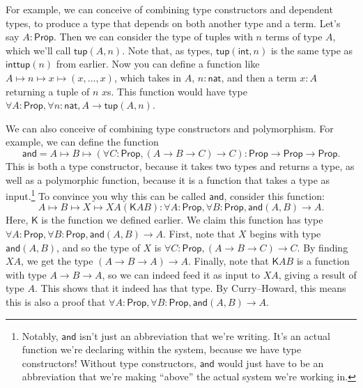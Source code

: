 \documentclass[11pt,paper=letter]{scrartcl}
\renewcommand{\sf}{\mathsf}
\newcommand{\prop}{\mathsf{Prop}}
\begin{document}
For example, we can conceive of combining type constructors and dependent types, to produce a type that depends on both another type and a term. Let's say $A: \prop$. Then we can consider the type of tuples with $n$ terms of type $A$, which we'll call $\sf{tup}(A, n)$. Note that, as types, $\sf{tup}(\sf{int}, n)$ is the same type as $\sf{inttup}(n)$ from earlier. Now you can define a function like $A \mapsto n \mapsto x \mapsto (x, \ldots, x)$, which takes in $A$, $n : \sf{nat}$, and then a term $x : A$ returning a tuple of $n$ $x$s. This function would have type $\forall A: \prop, \forall n: \sf{nat}, A \to \sf{tup}(A, n)$.

We can also conceive of combining type constructors and polymorphism. For example, we can define the function \[
  \sf{and} = A \mapsto B \mapsto (\forall C: \prop, (A \to B \to C) \to C)
  : \prop \to \prop \to \prop.
\]
This is both a type constructor, because it takes two types and returns a type, as well as a polymorphic function, because it is a function that takes a type as input.\footnote{Notably, $\sf{and}$ isn't just an abbreviation that we're writing. It's an actual function we're declaring within the system, because we have type constructors! Without type constructors, $\sf{and}$ would just have to be an abbreviation that we're making ``above'' the actual system we're working in.} To convince you why this can be called $\sf{and}$, consider this function: \[
  A \mapsto B \mapsto X \mapsto XA(\sf{K}AB)
  : \forall A: \prop,
  \forall B: \prop,
  \sf{and}(A, B) \to A.
\]
Here, $\sf{K}$ is the function we defined earlier. We claim this function has type $\forall A: \prop, \forall B: \prop, \sf{and}(A, B) \to A$. First, note that $X$ begins with type $\sf{and}(A, B)$, and so the type of $X$ is $\forall C: \prop, (A \to B \to C) \to C$. By finding $XA$, we get the type $(A \to B \to A) \to A$. Finally, note that $\sf{K}AB$ is a function with type $A \to B \to A$, so we can indeed feed it as input to $XA$, giving a result of type $A$. This shows that it indeed has that type. By Curry--Howard, this means this is also a proof that $\forall A: \prop, \forall B: \prop, \sf{and}(A, B) \to A$.
\end{document}
